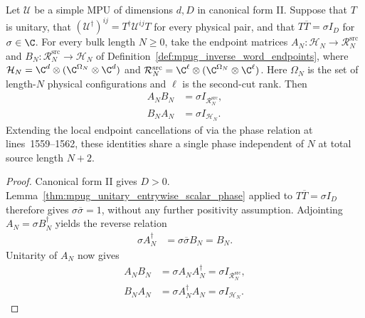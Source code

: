 \begin{lemma}
    \label{thm:mpug_inverse_word_phase_cancellation}
    \leanok
    Let $\mathcal U$ be a simple MPU of dimensions $d,D$ in canonical
    form II. Suppose that $T$ is unitary, that
    $(\mathcal U^\dagger)^{ij}=T^\dagger\mathcal U^{ij}T$ for every
    physical pair, and that $T\overline T=\sigma I_D$ for $\sigma\in\C$.
    For every bulk length $N\geq0$, take the endpoint matrices
    $A_N\colon\mathcal H_N\to\mathcal R_N^{\mathrm{src}}$ and
    $B_N\colon\mathcal R_N^{\mathrm{src}}\to\mathcal H_N$ of
    Definition~\ref{def:mpug_inverse_word_endpoints}, where
    $\mathcal H_N=\C^d\otimes(\C^{\Omega_N}\otimes\C^d)$ and
    $\mathcal R_N^{\mathrm{src}}=\C^\ell\otimes(\C^{\Omega_N}\otimes\C^\ell)$.
    Here $\Omega_N$ is the set of length-$N$ physical configurations and
    $\ell$ is the second-cut rank. Then
    \begin{align}
        A_NB_N & =\sigma I_{\mathcal R_N^{\mathrm{src}}}, \\
        B_NA_N & =\sigma I_{\mathcal H_N}.
    \end{align}
    Extending the local endpoint cancellations of
    \cite[lines~5444--5487]{FrancoRubio2025MPUGauging} via the phase
    relation at lines~1559--1562, these identities share a single phase
    independent of $N$ at total source length $N+2$.
\end{lemma}
\begin{proof}\leanok
    Canonical form II gives $D>0$.
    Lemma~\ref{thm:mpug_unitary_entrywise_scalar_phase} applied to
    $T\overline T=\sigma I_D$ therefore gives
    $\sigma\overline\sigma=1$, without any further positivity assumption.
    Adjointing $A_N=\sigma B_N^\dagger$ yields the reverse relation
    \begin{align}
        \sigma A_N^\dagger
         & =\sigma\overline\sigma B_N=B_N.
    \end{align}
    Unitarity of $A_N$ now gives
    \begin{align}
        A_NB_N & =\sigma A_NA_N^\dagger
        =\sigma I_{\mathcal R_N^{\mathrm{src}}}, \\
        B_NA_N & =\sigma A_N^\dagger A_N
        =\sigma I_{\mathcal H_N}.
    \end{align}
\end{proof}

